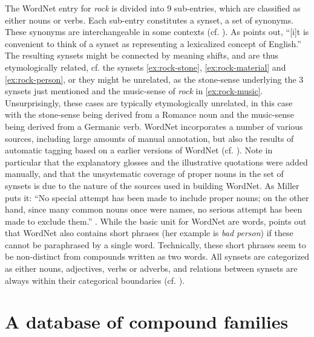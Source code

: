 The WordNet entry for \emph{rock} is divided into 9 sub-entries, which
are classified as either nouns or verbs. Each sub-entry constitutes a
synset, a set of synonyms. These synonyms are interchangeable in some
contexts (cf. \citealt[24]{Miller:1998}). As \citealt[24]{Miller:1998}
points out, ``[i]t is convenient to think of a synset as representing
a lexicalized concept of English.'' The resulting synsets
might be connected by meaning shifts, and are thus etymologically related, cf. the synsets
\ref{ex:rock-stone}, \ref{ex:rock-material} and \ref{ex:rock-person},
or they might be unrelated, as the stone-sense underlying the 3
synsets just mentioned and the music-sense of \emph{rock} in
\ref{ex:rock-music}. Unsurprisingly, these cases are typically
etymologically unrelated, in this case with the stone-sense being
derived from a Romance noun and the music-sense being derived from a
Germanic verb. WordNet incorporates a number of various
sources, including large amounts of manual annotation, but also the results of automatic tagging based on a earlier
versions of WordNet (cf. \citealt[xviii-xxi]{Miller:1998a}). Note in
particular that the explanatory glosses and the illustrative
quotations were added manually, and that the unsystematic coverage of
proper nouns in the set of synsets is due to the nature of the sources
used in building WordNet. As Miller puts it: ``No special attempt has
been made to include proper nouns; on the other hand, since many
common nouns once were names, no serious attempt has been made to
exclude them.''  \citet[23]{Miller:1998}. While the basic unit for
WordNet are words, \citet[5--6]{Fellbaum:1998} points out that WordNet also
contains short phrases (her example is \emph{bad person}) if these
cannot be paraphrased by a single word. Technically, these short
phrases seem to be non-distinct from compounds written as two
words. All synsets are categorized as either nouns, adjectives, verbs
or adverbs, and relations between synsets are always within their
categorical boundaries (cf. \citealt[5]{Fellbaum:1998}).

\section{A database of compound families}
\label{sec:methods1}

